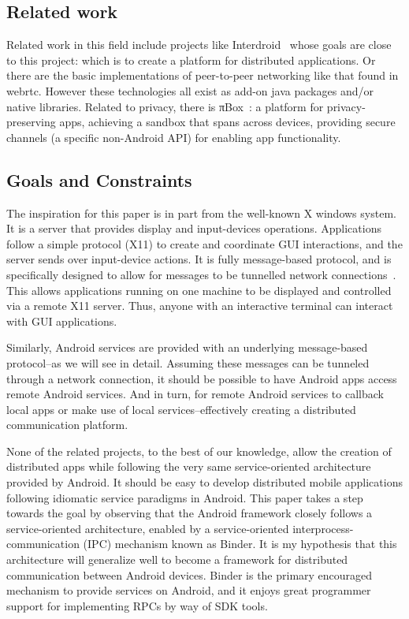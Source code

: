 \documentclass[prodmode]{acmlarge}
\begin{document}
\subsection{Related work}
Related work in this field include projects like Interdroid~\cite{Interdroid} whose goals are close to this project: which is to create a platform for distributed applications. Or there are the basic implementations of peer-to-peer networking like that found in webrtc. However these technologies all exist as add-on java packages and/or native libraries. Related to privacy, there is πBox~\cite{piBox}: a platform for privacy-preserving apps, achieving a sandbox that spans across devices, providing secure channels (a specific non-Android API) for enabling app functionality.

\subsection{Goals and Constraints}
The inspiration for this paper is in part from the well-known X windows system. It is a server that provides display and input-devices operations. Applications follow a simple protocol (X11) to create and coordinate GUI interactions, and the server sends over input-device actions. It is fully message-based protocol, and is specifically designed to allow for messages to be tunnelled network connections~\cite{X11}. This allows applications running on one machine to be displayed and controlled via a remote X11 server. Thus, anyone with an interactive terminal can interact with GUI applications.

Similarly, Android services are provided with an underlying message-based protocol--as we will see in detail. Assuming these messages can be tunneled through a network connection, it should be possible to have Android apps access remote Android services. And in turn, for remote Android services to callback local apps or make use of local services--effectively creating a distributed communication platform.

None of the related projects, to the best of our knowledge, allow the creation of distributed apps while following the very same service-oriented architecture provided by Android. It should be easy to develop distributed mobile applications following idiomatic service paradigms in Android. This paper takes a step towards the goal by observing that the Android framework closely follows a service-oriented architecture, enabled by a service-oriented interprocess- communication (IPC) mechanism known as Binder. It is my hypothesis that this architecture will generalize well to become a framework for distributed communication between Android devices. Binder is the primary encouraged mechanism to  provide services on Android, and it enjoys great programmer support for implementing RPCs by way of SDK tools.
\end{document}
